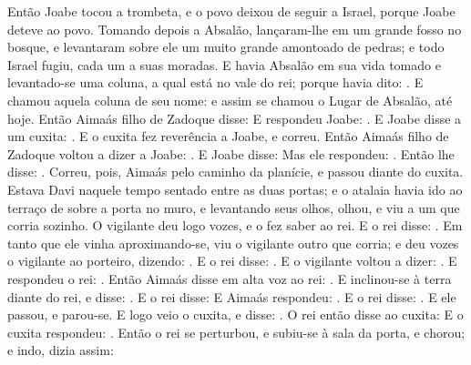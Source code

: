 {  Então Joabe tocou a trombeta, e o povo deixou de seguir a Israel, porque Joabe deteve ao povo.
  Tomando depois a Absalão, lançaram-lhe em um grande fosso no bosque, e levantaram sobre ele um muito grande amontoado de pedras; e todo Israel fugiu, cada um a suas moradas.
  E havia Absalão em sua vida tomado e levantado-se uma coluna, a qual está no vale do rei; porque havia dito: . E chamou aquela coluna de seu nome: e assim se chamou o Lugar de Absalão, até hoje.
  Então Aimaás filho de Zadoque disse: 
  E respondeu Joabe: .
  E Joabe disse a um cuxita: . E o cuxita fez reverência a Joabe, e correu.
  Então Aimaás filho de Zadoque voltou a dizer a Joabe: . E Joabe disse:  %
  Mas ele respondeu: . Então lhe disse: . Correu, pois, Aimaás pelo caminho da planície, e passou diante do cuxita.
  Estava Davi naquele tempo sentado entre as duas portas; e o atalaia havia ido ao terraço de sobre a porta no muro, e levantando seus olhos, olhou, e viu a um que corria sozinho.
  O vigilante deu logo vozes, e o fez saber ao rei. E o rei disse: . Em tanto que ele vinha aproximando-se, %
  viu o vigilante outro que corria; e deu vozes o vigilante ao porteiro, dizendo: . E o rei disse: .
  E o vigilante voltou a dizer: . E respondeu o rei: .
  Então Aimaás disse em alta voz ao rei: . E inclinou-se à terra diante do rei, e disse: .
  E o rei disse:  E Aimaás respondeu: .
  E o rei disse: . E ele passou, e parou-se.
  E logo veio o cuxita, e disse: .
  O rei então disse ao cuxita:  E o cuxita respondeu: .
  Então o rei se perturbou, e subiu-se à sala da porta, e chorou; e indo, dizia assim: 
\par }

